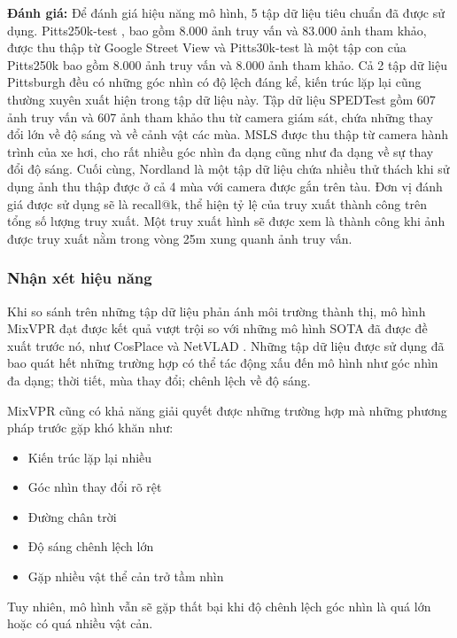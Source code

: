 \textbf{Đánh giá:} Để đánh giá hiệu năng mô hình, 5 tập dữ liệu tiêu chuẩn đã được sử dụng. Pitts250k-test \cite{6618963}, bao gồm 8.000 ảnh truy vấn và 83.000 ảnh tham khảo, được thu thập từ Google Street View và Pitts30k-test \cite{6618963} là một tập con của Pitts250k bao gồm 8.000 ảnh truy vấn và 8.000 ảnh tham khảo. Cả 2 tập dữ liệu Pittsburgh đều có những góc nhìn có độ lệch đáng kể, kiến trúc lặp lại cũng thường xuyên xuất hiện trong tập dữ liệu này. Tập dữ liệu SPEDTest \cite{zaffar2021vpr} gồm 607 ảnh truy vấn và 607 ảnh tham khảo thu từ camera giám sát, chứa những thay đổi lớn về độ sáng và về cảnh vật các mùa. MSLS \cite{warburg2020mapillary} được thu thập từ camera hành trình của xe hơi, cho rất nhiều góc nhìn đa dạng cũng như đa dạng về sự thay đổi độ sáng. Cuối cùng, Nordland \cite{zaffar2021vpr} là một tập dữ liệu chứa nhiều thử thách khi sử dụng ảnh thu thập được ở cả 4 mùa với camera được gắn trên tàu. Đơn vị đánh giá được sử dụng sẽ là recall@k, thể hiện tỷ lệ của truy xuất thành công trên tổng số lượng truy xuất. Một truy xuất hình sẽ được xem là thành công khi ảnh được truy xuất nằm trong vòng 25m xung quanh ảnh truy vấn.

\subsubsection{Nhận xét hiệu năng}
Khi so sánh trên những tập dữ liệu phản ánh môi trường thành thị, mô hình MixVPR đạt được kết quả vượt trội so với những mô hình SOTA đã được đề xuất trước nó, như CosPlace \cite{berton2022rethinking} và NetVLAD \cite{arandjelovic2016netvlad}. Những tập dữ liệu được sử dụng đã bao quát hết những trường hợp có thể tác động xấu đến mô hình như góc nhìn đa dạng; thời tiết, mùa thay đổi; chênh lệch về độ sáng.

MixVPR cũng có khả năng giải quyết được những trường hợp mà những phương pháp trước gặp khó khăn như:
\begin{itemize}
  \item Kiến trúc lặp lại nhiều
  \item Góc nhìn thay đổi rõ rệt
  \item Đường chân trời
  \item Độ sáng chênh lệch lớn
  \item Gặp nhiều vật thể cản trở tầm nhìn
\end{itemize}
Tuy nhiên, mô hình vẫn sẽ gặp thất bại khi độ chênh lệch góc nhìn là quá lớn hoặc có quá nhiều vật cản.

